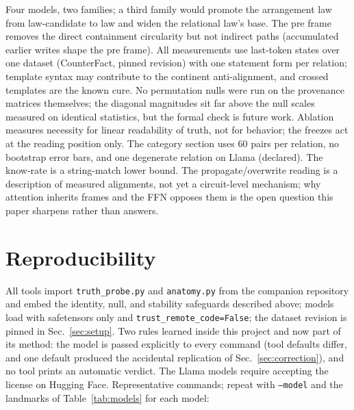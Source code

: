 \documentclass[11pt]{article}
\begin{document}
Four models, two families; a third family would promote the arrangement
law from law-candidate to law and widen the relational law's base. The pre
frame removes the direct containment circularity but not indirect paths
(accumulated earlier writes shape the pre frame). All measurements use
last-token states over one dataset (CounterFact, pinned revision) with one
statement form per relation; template syntax may contribute to the
continent anti-alignment, and crossed templates are the known cure. No
permutation nulls were run on the provenance matrices themselves; the
diagonal magnitudes sit far above the null scales measured on identical
statistics, but the formal check is future work. Ablation measures
necessity for linear readability of truth, not for behavior; the freezes
act at the reading position only. The category section uses $60$ pairs per
relation, no bootstrap error bars, and one degenerate relation on Llama
(declared). The know-rate is a string-match lower bound. The
propagate/overwrite reading is a description of measured alignments, not
yet a circuit-level mechanism; why attention inherits frames and the FFN
opposes them is the open question this paper sharpens rather than answers.

\section{Reproducibility}
\label{sec:repro}

All tools import \texttt{truth\_probe.py} and \texttt{anatomy.py} from the
companion repository and embed the identity, null, and stability
safeguards described above; models load with safetensors only and
\texttt{trust\_remote\_code=False}; the dataset revision is pinned in
Sec.~\ref{sec:setup}. Two rules learned inside this project and now part of
its method: the model is passed explicitly to every command (tool defaults
differ, and one default produced the accidental replication of
Sec.~\ref{sec:correction}), and no tool prints an automatic verdict. The
Llama models require accepting the license on Hugging Face. Representative
commands; repeat with \texttt{--model} and the landmarks of
Table~\ref{tab:models} for each model:
\end{document}
